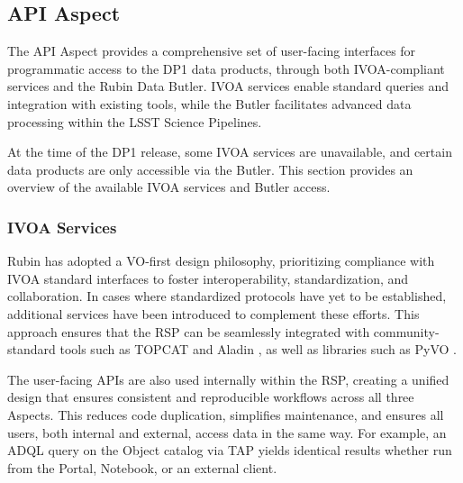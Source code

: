 \subsection{API Aspect}
\label{ssec:rsp_api}
The \gls{API} Aspect provides a comprehensive set of user-facing interfaces for programmatic access to the \gls{DP1} data products, through both \gls{IVOA}-compliant services and the Rubin Data Butler. IVOA services enable standard queries and integration with existing tools, while the Butler facilitates advanced data processing within the LSST Science Pipelines.

At the time of the \gls{DP1} release, some \gls{IVOA} services are unavailable, and certain data products are only accessible via the Butler.
This section provides an overview of the available \gls{IVOA} services and Butler access.

\subsubsection{IVOA Services}
\label{sssec:ivoa_services}

Rubin has adopted a \gls{VO}-first design philosophy, prioritizing compliance with \gls{IVOA} standard interfaces to foster interoperability, standardization, and collaboration.
In cases where standardized protocols have yet to be established, additional services have been introduced to complement these efforts.
This approach ensures that the RSP can be seamlessly integrated with community-standard tools such as \gls{TOPCAT} \citep{2011ascl.soft01010T} and Aladin \citep{2000A&AS..143...33B, 2014ASPC..485..277B, 2022ASPC..532....7B}, as well as libraries such as  PyVO \citep{2014ascl.soft02004G}.

The user-facing \glspl{API} are also used internally within the \gls{RSP}, creating a unified design that ensures consistent and reproducible workflows across all three Aspects.
This reduces code duplication, simplifies maintenance, and ensures all users, both internal and external, access data in the same way.
For example, an \gls{ADQL} query on the \gls{Object} catalog via TAP yields identical results whether run from the Portal, Notebook, or an external client.

